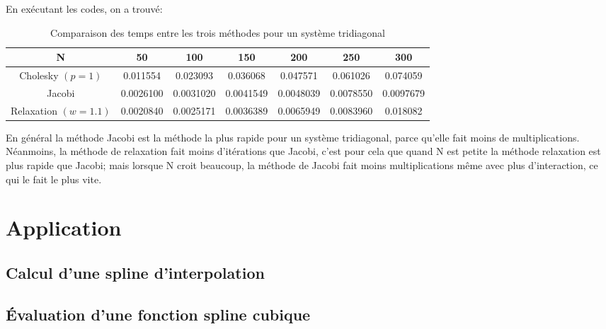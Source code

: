 \documentclass[a4paper,11pt]{article}
\begin{document}
En exécutant les codes, on a trouvé:

\begin{table}[h!]
  \begin{center}
    \begin{tabular}{|c|c|c|c|c|c|c|}
      \hline 
      N & 50 & 100 & 150 & 200 & 250 & 300 \\
      \hline 
      \hline 
      Cholesky $(p=1)$ & 0.011554       &  0.023093 & 0.036068
      & 0.047571 & 0.061026 & 0.074059 \\
      Jacobi &   0.0026100
      & 0.0031020
      & 0.0041549
      & 0.0048039
      & 0.0078550
      & 0.0097679        \\
      Relaxation $(w = 1.1)$
      & 0.0020840
      & 0.0025171
      & 0.0036389 
      & 0.0065949
      & 0.0083960
      & 0.018082\\
      \hline 
    \end{tabular}
  \end{center}
  \caption{Comparaison des temps entre les trois méthodes pour un système tridiagonal}
\end{table}

En général la méthode Jacobi est la méthode la plus rapide pour un
système     tridiagonal,    parce     qu'elle    fait     moins  de
multiplications. Néanmoins, la méthode de relaxation fait moins d'itérations que
Jacobi, c'est pour cela que quand N  est petite la méthode relaxation est plus rapide
que Jacobi; mais lorsque N croit beaucoup, la méthode de Jacobi fait moins multiplications
même avec plus d'interaction, ce qui le fait le plus vite.


\section{Application}
\subsection{Calcul d'une spline d'interpolation}
\begin{multicols}{2}
  
\end{multicols}

\subsection{Évaluation d'une fonction spline cubique}


\begin{multicols}{2}
  
\end{multicols}
\end{document}
